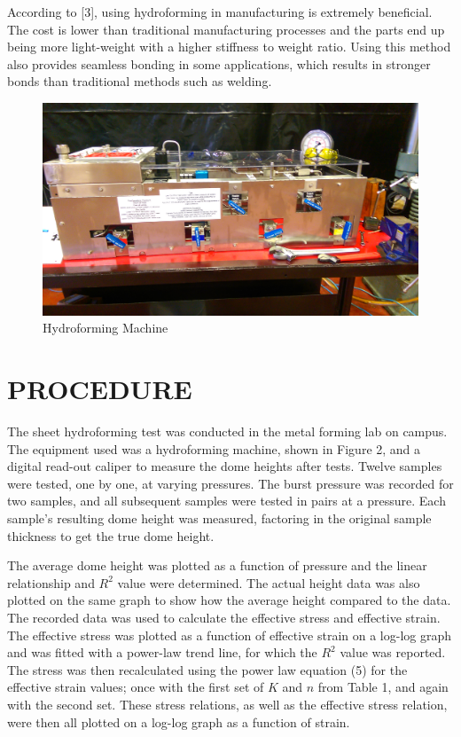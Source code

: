 \documentclass[12pt]{article}
\begin{document}
According to [3], using hydroforming in manufacturing is extremely beneficial. The cost is lower than traditional manufacturing processes and the parts end up being more light-weight with a higher stiffness to weight ratio. Using this method also provides seamless bonding in some applications, which results in stronger bonds than traditional methods such as welding. 
\bigskip
 


\newpage

\begin{figure}[htbp] %
   \centering
   \includegraphics[width=5in]{IMAG00404.jpg} 
   \caption{Hydroforming Machine}
   \label{fig:example}
\end{figure}
\bigskip


\section*{\fontsize{12}{12}\selectfont PROCEDURE}
The sheet hydroforming test was conducted in the metal forming lab on campus. The equipment used was a hydroforming machine, shown in Figure 2, and a digital read-out caliper to measure the dome heights after tests. Twelve samples were tested, one by one, at varying pressures. The burst pressure was recorded for two samples, and all subsequent samples were tested in pairs at a pressure. Each sample's resulting dome height was measured, factoring in the original sample thickness to get the true dome height. 
\bigskip

The average dome height was plotted as a function of pressure and the linear relationship and $R^2$ value were determined. The actual height data was also plotted on the same graph to show how the average height compared to the data. The recorded data was used to calculate the effective stress and effective strain. The effective stress was plotted as a function of effective strain on a log-log graph and was fitted with a power-law trend line, for which the $R^2$ value was reported. The stress was then recalculated using the power law equation (5) for the effective strain values; once with the first set of $K$ and $n$ from Table 1, and again with the second set. These stress relations, as well as the effective stress relation, were then all plotted on a log-log graph as a function of strain.
\end{document}
